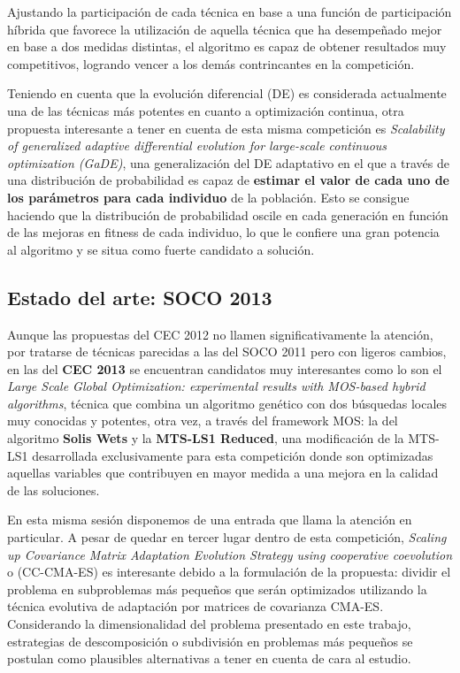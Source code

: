 Ajustando la participación de cada técnica en base a una función de participación híbrida que favorece la utilización de aquella técnica que ha desempeñado mejor en base a dos medidas distintas, el algoritmo es capaz de obtener resultados muy competitivos, logrando vencer a los demás contrincantes en la competición.
 
Teniendo en cuenta que la evolución diferencial (DE)\cite{DE} es considerada actualmente una de las técnicas más potentes en cuanto a optimización continua, otra propuesta interesante a tener en cuenta de esta misma competición es \textit{Scalability of generalized adaptive differential evolution for large-scale continuous optimization (GaDE)}\cite{GaDE}, una generalización del DE adaptativo en el que a través de una distribución de probabilidad es capaz de \textbf{estimar el valor de cada uno de los parámetros para cada individuo} de la población. Esto se consigue haciendo que la distribución de probabilidad oscile en cada generación en función de las mejoras en fitness de cada individuo, lo que le confiere una gran potencia al algoritmo y se situa como fuerte candidato a solución.

\subsection{Estado del arte: SOCO 2013}

Aunque las propuestas del CEC 2012 no llamen significativamente la atención, por tratarse de técnicas parecidas a las del SOCO 2011 pero con ligeros cambios, en las del \textbf{CEC 2013} se encuentran candidatos muy interesantes como lo son el \textit{Large Scale Global Optimization: experimental results with MOS-based hybrid algorithms}\cite{MOS2013}, técnica que combina un algoritmo genético con dos búsquedas locales muy conocidas y potentes, otra vez, a través del framework MOS: la del algoritmo \textbf{Solis Wets}\cite{SolisWets} y la \textbf{MTS-LS1 Reduced}, una modificación de la MTS-LS1\cite{MTS-LSGO} desarrollada exclusivamente para esta competición donde son optimizadas aquellas variables que contribuyen en mayor medida a una mejora en la calidad de las soluciones.

En esta misma sesión disponemos de una entrada que llama la atención en particular. A pesar de quedar en tercer lugar dentro de esta competición, \textit{Scaling up Covariance Matrix Adaptation Evolution Strategy using cooperative coevolution}\cite{CC-CMAES} o (CC-CMA-ES) es interesante debido a la formulación de la propuesta: dividir el problema en subproblemas más pequeños que serán optimizados utilizando la técnica evolutiva de adaptación por matrices de covarianza CMA-ES. Considerando la dimensionalidad del problema presentado en este trabajo, estrategias de descomposición o subdivisión en problemas más pequeños se postulan como plausibles alternativas a tener en cuenta de cara al estudio.

